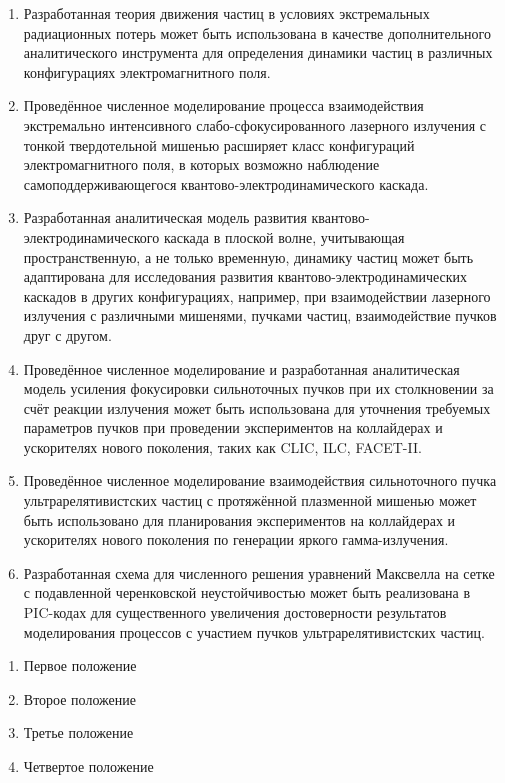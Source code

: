 \vspace{0.25cm}
{\influence}
\begin{enumerate}[beginpenalty=10000]
  \item Разработанная теория движения частиц в условиях экстремальных радиационных потерь может быть использована в качестве дополнительного аналитического инструмента для определения динамики частиц в различных конфигурациях электромагнитного поля.
  \item Проведённое численное моделирование процесса взаимодействия экстремально интенсивного слабо-сфокусированного лазерного излучения с тонкой твердотельной мишенью расширяет класс конфигураций электромагнитного поля, в которых возможно наблюдение самоподдерживающегося квантово-электродинамического каскада.
  \item Разработанная аналитическая модель развития квантово-электро\-динамического каскада в плоской волне, учитывающая пространственную, а не только временную, динамику частиц может быть адаптирована для исследования развития квантово-электродинамических каскадов в других конфигурациях, например, при взаимодействии лазерного излучения с различными мишенями, пучками частиц, взаимодействие пучков друг с другом. 
  \item Проведённое численное моделирование и разработанная аналитическая модель усиления фокусировки сильноточных пучков при их столкновении за счёт реакции излучения может быть использована для уточнения требуемых параметров пучков при проведении экспериментов на коллайдерах и ускорителях нового поколения, таких как CLIC, ILC, FACET-II.
  \item Проведённое численное моделирование взаимодействия сильноточного пучка ультрарелятивистских частиц с протяжённой плазменной мишенью может быть использовано для планирования экспериментов на коллайдерах и ускорителях нового поколения по генерации яркого гамма-излучения. 
  \item Разработанная схема для численного решения уравнений Максвелла на сетке с подавленной черенковской неустойчивостью может быть реализована в PIC-кодах для существенного увеличения достоверности результатов моделирования процессов с участием пучков ультрарелятивистских частиц.
\end{enumerate}


\vspace{0.25cm}
{}
\begin{enumerate}[beginpenalty=10000] %
  \item Первое положение
  \item Второе положение
  \item Третье положение
  \item Четвертое положение
\end{enumerate}

